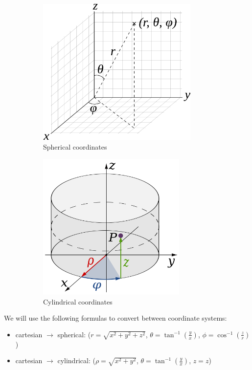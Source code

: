 \documentclass{article}
\begin{document}
\begin{enumerate}
\begin{figure}[h!!!]
        \centering
	\begin{subfigure}[b]{0.48\textwidth}
	\centering
	\includegraphics[height=2.9in]{"./figures/spherical"}
	\caption{Spherical coordinates}
	\label{fig:spherical_coords}
	\end{subfigure}
        \quad%
	\begin{subfigure}[b]{0.48\textwidth}
	\centering
	\includegraphics[height=2.9in]{"./figures/cylindrical"}
	\caption{Cylindrical coordinates}
	\label{fig:cylindrical_coords}
	\end{subfigure}
	 \caption{}\label{fig:coord_systems}
\end{figure}

We will use the following formulas to convert between coordinate systems:

\begin{itemize}
\item{cartesian $\rightarrow$ spherical: ($r = \sqrt{x^2 + y^2 + z^2}$, $\theta = \tan^{-1}\left(\frac{y}{x}\right)$, $\phi = \cos^{-1}\left(\frac{z}{r}\right)$)}
\item{cartesian $\rightarrow$ cylindrical: ($\rho = \sqrt{x^2 + y^2}$, $\theta = \tan^{-1}\left(\frac{y}{x}\right)$, $z = z$)}


\end{itemize}
\end{enumerate}
\end{document}
